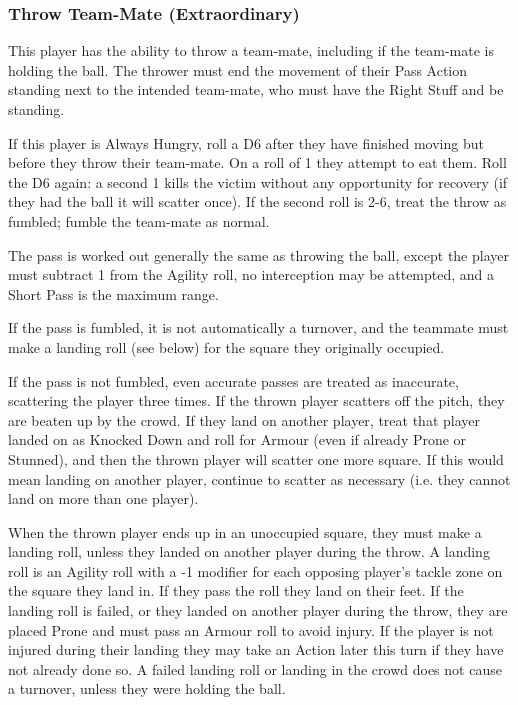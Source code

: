 \documentclass{article}
\begin{document}
\begin{multicols}{3}
\subsubsection{Throw Team-Mate (Extraordinary)}
\par This player has the ability to throw a team-mate, including if the team-mate is holding the ball. The thrower must end the movement of their Pass Action standing next to the intended team-mate, who must have the Right Stuff and be standing.
\par If this player is Always Hungry, roll a D6 after they have finished moving but before they throw their team-mate. On a roll of 1 they attempt to eat them. Roll the D6 again: a second 1 kills the victim without any opportunity for recovery (if they had the ball it will scatter once). If the second roll is 2-6, treat the throw as fumbled; fumble the team-mate as normal.
\par The pass is worked out generally the same as throwing the ball, except the player must subtract 1 from the Agility roll, no interception may be attempted, and a Short Pass is the maximum range.
\par If the pass is fumbled, it is not automatically a turnover, and the teammate must make a landing roll (see below) for the square they originally occupied.
\par If the pass is not fumbled, even accurate passes are treated as inaccurate, scattering the player three times. If the thrown player scatters off the pitch, they are beaten up by the crowd. If they land on another player, treat that player landed on as Knocked Down and roll for Armour (even if already Prone or Stunned), and then the thrown player will scatter one more square. If this would mean landing on another player, continue to scatter as necessary (i.e. they cannot land on more than one player).
\par When the thrown player ends up in an unoccupied square, they must make a landing roll, unless they landed on another player during the throw. A landing roll is an Agility roll with a -1 modifier for each opposing player's tackle zone on the square they land in. If they pass the roll they land on their feet. If the landing roll is failed, or they landed on another player during the throw, they are placed Prone and must pass an Armour roll to avoid injury. If the player is not injured during their landing they may take an Action later this turn if they have not already done so. A failed landing roll or landing in the crowd does not cause a turnover, unless they were holding the ball.


\end{multicols}
\end{document}
